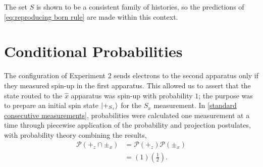 The set $S$ is shown to be a consistent family of histories, so the predictions of \autoref{eq:reproducing born rule} are made within this context.

\section{Conditional Probabilities}
The configuration of Experiment 2 sends electrons to the second apparatus only if they measured spin-up in the first apparatus. This allowed us to assert that the state routed to the $\hat{x}$ apparatus was spin-up with probability $1$; the purpose was to prepare an initial spin state $\ket{+_{S_z}}$ for the $S_x$ measurement. In \autoref{standard consecutive measurements}, probabilities were calculated one measurement at a time through piecewise application of the probability and projection postulates, with probability theory combining the results,
\begin{align}
  \mathcal{P}(+_z \cap \pm_x) &= \mathcal{P}(+_z)\mathcal{P}(\pm_x) \\ \nonumber
  &= (1)\left(\frac{1}{2}\right).
\end{align}

